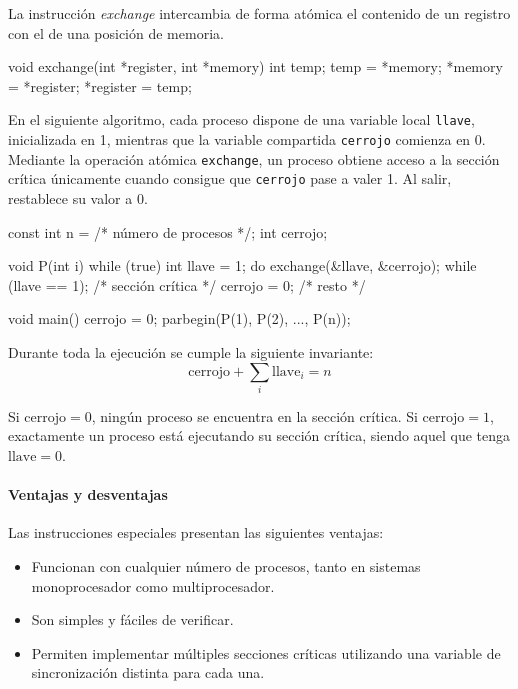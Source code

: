 La instrucción \textit{exchange} intercambia de forma atómica el contenido de un registro con el de una posición de memoria.

\begin{ccode}[title=Ejemplo de firma de la instrucción Exchange]
void exchange(int *register, int *memory) {
  int temp;
  temp = *memory;
  *memory = *register;
  *register = temp;
}
\end{ccode}

En el siguiente algoritmo, cada proceso dispone de una variable local \texttt{llave}, inicializada en 1, mientras que la variable compartida \texttt{cerrojo} comienza en 0. Mediante la operación atómica \texttt{exchange}, un proceso obtiene acceso a la sección crítica únicamente cuando consigue que \texttt{cerrojo} pase a valer 1. Al salir, restablece su valor a 0.

\begin{ccode}[title=Exclusión mutua usando Exchange]
const int n = /* número de procesos */;
int cerrojo;

void P(int i) {
  while (true) {
    int llave = 1;
    do {
      exchange(&llave, &cerrojo);
    } while (llave == 1);
    /* sección crítica */
    cerrojo = 0;
    /* resto */
  }
}

void main() {
  cerrojo = 0;
  parbegin(P(1), P(2), ..., P(n));
}
\end{ccode}

Durante toda la ejecución se cumple la siguiente invariante:
\[
\text{cerrojo} + \sum_i \text{llave}_i = n
\]

Si $\text{cerrojo}=0$, ningún proceso se encuentra en la sección crítica. Si $\text{cerrojo}=1$, exactamente un proceso está ejecutando su sección crítica, siendo aquel que tenga $\text{llave}=0$.

\paragraph{Ventajas y desventajas}

Las instrucciones especiales presentan las siguientes ventajas:

\begin{itemize}
    \item Funcionan con cualquier número de procesos, tanto en sistemas monoprocesador como multiprocesador.
    \item Son simples y fáciles de verificar.
    \item Permiten implementar múltiples secciones críticas utilizando una variable de sincronización distinta para cada una.
\end{itemize}

